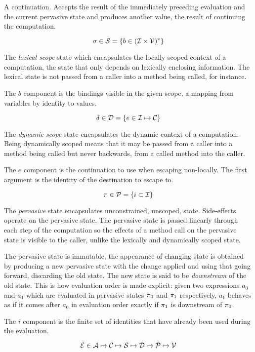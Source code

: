\documentclass{article}
\begin{document}
A continuation. Accepts the result of the immediately preceding evaluation and
the current pervasive state and produces another value, the result of continuing
the computation.

\[ \sigma \in \mathcal{S} = \{ b \in (\mathcal{I} \times \mathcal{V})^* \} \]

The \emph{lexical scope} state which encapsulates the locally scoped context of
a computation, the state that only depends on lexically enclosing
information. The lexical state is not passed from a caller into a method being
called, for instance.

The $b$ component is the bindings visible in the given scope, a mapping from
variables by identity to values.

\[ \delta \in \mathcal{D} = \{ e \in \mathcal{I} \mapsto \mathcal{C} \} \]

The \emph{dynamic scope} state encapsulates the dynamic context of a
computation.  Being dynamically scoped means that it may be passed from a caller
into a method being called but never backwards, from a called method into the
caller.

The $e$ component is the continuation to use when escaping non-locally. The
first argument is the identity of the destination to escape to.

\[ \pi \in \mathcal{P} = \{ i \subset \mathcal{I} \} \]

The \emph{pervasive} state encapsulates unconstrained, unscoped, state.
Side-effects operate on the pervasive state. The pervasive state is passed
linearly through each step of the computation so the effects of a method call on
the pervasive state is visible to the caller, unlike the lexically and
dynamically scoped state.

The pervasive state is immutable, the appearance of changing state is obtained
by producing a new pervasive state with the change applied and using that going
forward, discarding the old state. The new state is said to be \emph{downstream}
of the old state. This is how evaluation order is made explicit: given two
expressions $a_0$ and $a_1$ which are evaluated in pervasive states $\pi_0$
and $\pi_1$ respectively, $a_1$ behaves as if it comes after $a_0$ in
evaluation order exactly if $\pi_1$ is downstream of $\pi_0$.

The $i$ component is the finite set of identities that have already been used
during the evaluation.

\[ \mathcal{E} \in \mathcal{A} \mapsto \mathcal{C} \mapsto \mathcal{S} \mapsto \mathcal{D} \mapsto \mathcal{P} \mapsto \mathcal{V} \]
\end{document}
